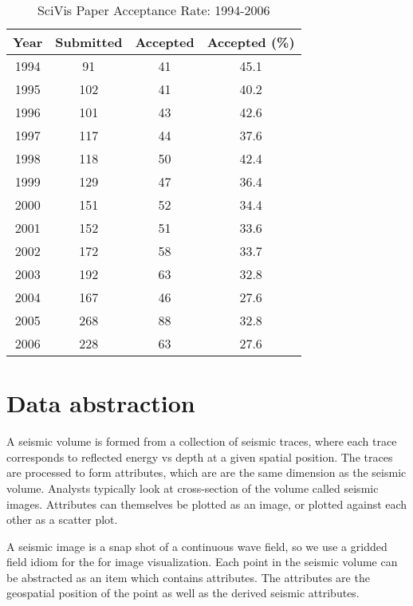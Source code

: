 \documentclass[journal]{vgtc}                %
\begin{document}
\begin{table}
 \caption{SciVis Paper Acceptance Rate: 1994-2006}
 \label{vis_accept}
 \scriptsize
 \begin{center}
   \begin{tabular}{cccc}
     Year & Submitted & Accepted & Accepted (\%)\\
   \hline
     1994 &  91 & 41 & 45.1\\
     1995 & 102 & 41 & 40.2\\
     1996 & 101 & 43 & 42.6\\
     1997 & 117 & 44 & 37.6\\
     1998 & 118 & 50 & 42.4\\
     1999 & 129 & 47 & 36.4\\
     2000 & 151 & 52 & 34.4\\
     2001 & 152 & 51 & 33.6\\
     2002 & 172 & 58 & 33.7\\
     2003 & 192 & 63 & 32.8\\
     2004 & 167 & 46 & 27.6\\
     2005 & 268 & 88 & 32.8\\
     2006 & 228 & 63 & 27.6
   \end{tabular}
 \end{center}
\end{table}


\section{Data abstraction}
A seismic volume is formed from a collection of seismic traces, where each trace
corresponds to reflected energy vs depth at a given spatial position. The traces are processed
to form attributes, which are are the same dimension as the seismic volume. Analysts typically
look at cross-section of the volume called seismic images. Attributes
can themselves be plotted as an image, or plotted against each other as a scatter plot.

A seismic image is a snap shot of a continuous wave field, so we use a gridded field
idiom for the for image visualization. Each point in the seismic volume can be abstracted
as an item which contains attributes. The attributes are the geospatial position of the
point as well as the derived seismic attributes.
\end{document}
